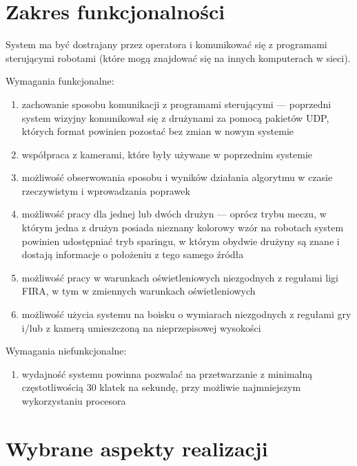 \documentclass[polish,12pt]{aghthesis}
\begin{document}
\section{Zakres funkcjonalności}
\label{sec:zakres-funkcjonalnosci}
% 

System ma być dostrajany przez operatora i komunikować się z programami
sterującymi robotami (które mogą znajdować się na innych 
komputerach w sieci).

Wymagania funkcjonalne:
\begin{enumerate}
\item zachowanie sposobu komunikacji z programami sterującymi --- poprzedni
system wizyjny komunikował się z drużynami za pomocą pakietów UDP, których
format powinien pozostać bez zmian w nowym systemie
\item współpraca z kamerami, które były używane w poprzednim systemie
\item możliwość obserwowania sposobu i wyników działania algorytmu w czasie
rzeczywistym i wprowadzania poprawek
\item możliwość pracy dla jednej lub dwóch drużyn --- oprócz trybu meczu, w 
którym jedna z drużyn posiada nieznany kolorowy wzór na robotach system powinien
udostępniać tryb sparingu, w którym obydwie drużyny są znane i dostają 
informacje o położeniu z tego samego źródła
\item możliwość pracy w warunkach oświetleniowych niezgodnych z regułami ligi 
FIRA, w tym w zmiennych warunkach oświetleniowych
\item możliwość użycia systemu na boisku o wymiarach niezgodnych z regułami gry
i/lub z kamerą umieszczoną na nieprzepisowej wysokości

\end{enumerate}
Wymagania niefunkcjonalne:
\begin{enumerate}
\item wydajność systemu powinna pozwalać na przetwarzanie z minimalną
częstotliwością 30 klatek na sekundę, przy możliwie najmniejszym wykorzystaniu
procesora
\end{enumerate}



\section{Wybrane aspekty realizacji}
\label{sec:wybrane-aspekty-realizacji}
\end{document}
